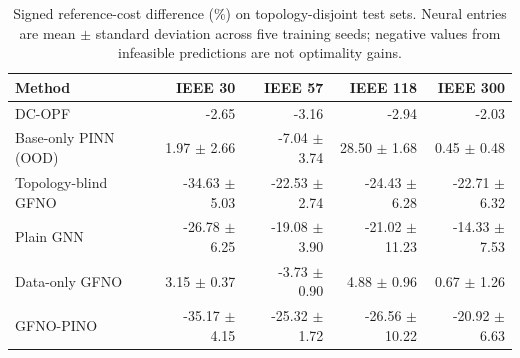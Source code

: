 \begin{table}[t]
\centering
\caption{Signed reference-cost difference (\%) on topology-disjoint test sets. Neural entries are mean $\pm$ standard deviation across five training seeds; negative values from infeasible predictions are not optimality gains.}
\label{tab:optimality}
\scriptsize
\begin{tabular}{lrrrr}
\toprule
Method & IEEE 30 & IEEE 57 & IEEE 118 & IEEE 300 \\
\midrule
DC-OPF & -2.65 & -3.16 & -2.94 & -2.03 \\
Base-only PINN (OOD) & 1.97 $\pm$ 2.66 & -7.04 $\pm$ 3.74 & 28.50 $\pm$ 1.68 & 0.45 $\pm$ 0.48 \\
Topology-blind GFNO & -34.63 $\pm$ 5.03 & -22.53 $\pm$ 2.74 & -24.43 $\pm$ 6.28 & -22.71 $\pm$ 6.32 \\
Plain GNN & -26.78 $\pm$ 6.25 & -19.08 $\pm$ 3.90 & -21.02 $\pm$ 11.23 & -14.33 $\pm$ 7.53 \\
Data-only GFNO & 3.15 $\pm$ 0.37 & -3.73 $\pm$ 0.90 & 4.88 $\pm$ 0.96 & 0.67 $\pm$ 1.26 \\
GFNO-PINO & -35.17 $\pm$ 4.15 & -25.32 $\pm$ 1.72 & -26.56 $\pm$ 10.22 & -20.92 $\pm$ 6.63 \\
\bottomrule
\end{tabular}
\end{table}
